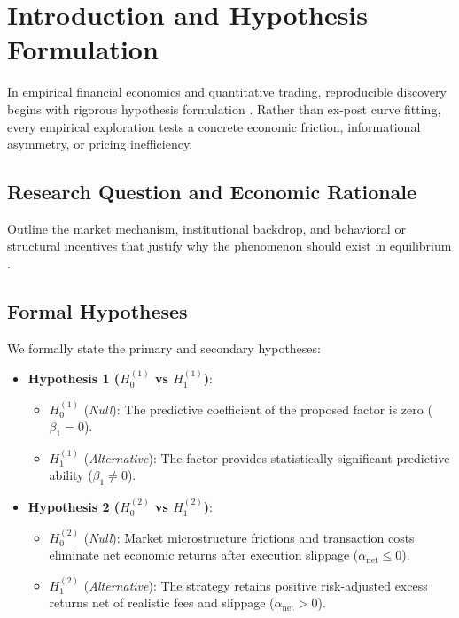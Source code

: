 \documentclass{article}
\begin{document}
\section{Introduction and Hypothesis Formulation}
\label{sec:intro}

In empirical financial economics and quantitative trading, reproducible discovery begins with rigorous hypothesis formulation \citep{fama1970efficient}. Rather than ex-post curve fitting, every empirical exploration tests a concrete economic friction, informational asymmetry, or pricing inefficiency.

\subsection{Research Question and Economic Rationale}
Outline the market mechanism, institutional backdrop, and behavioral or structural incentives that justify why the phenomenon should exist in equilibrium \citep{stoll1990dynamics, shleifer1997limits}.

\subsection{Formal Hypotheses}
We formally state the primary and secondary hypotheses:
\begin{itemize}
    \item \textbf{Hypothesis 1 ($H_0^{(1)}$ vs $H_1^{(1)}$)}:
    \begin{itemize}
        \item $H_0^{(1)}$ (\textit{Null}): The predictive coefficient of the proposed factor is zero ($\beta_1 = 0$).
        \item $H_1^{(1)}$ (\textit{Alternative}): The factor provides statistically significant predictive ability ($\beta_1 \ne 0$).
    \end{itemize}
    \item \textbf{Hypothesis 2 ($H_0^{(2)}$ vs $H_1^{(2)}$)}:
    \begin{itemize}
        \item $H_0^{(2)}$ (\textit{Null}): Market microstructure frictions and transaction costs eliminate net economic returns after execution slippage ($\alpha_{\text{net}} \le 0$).
        \item $H_1^{(2)}$ (\textit{Alternative}): The strategy retains positive risk-adjusted excess returns net of realistic fees and slippage ($\alpha_{\text{net}} > 0$).
    \end{itemize}
\end{itemize}
\end{document}
